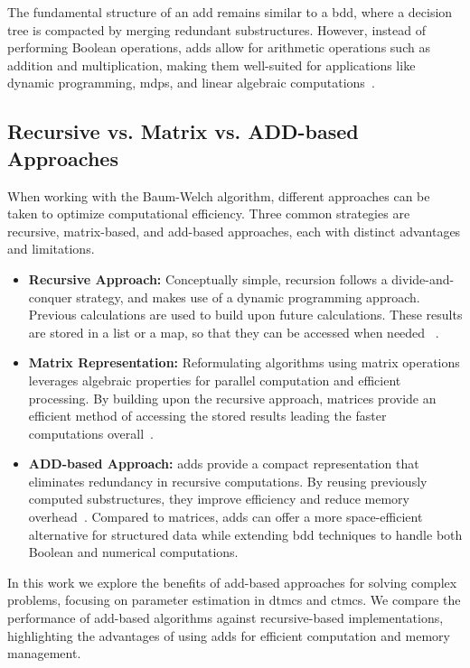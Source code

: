 The fundamental structure of an \gls{add} remains similar to a \gls{bdd}, where a decision tree is compacted by merging redundant substructures.
However, instead of performing Boolean operations, \glspl{add} allow for arithmetic operations such as addition and multiplication, making them well-suited for applications like dynamic programming, \glspl{mdp}, and linear algebraic computations~\cite{bahar1997algebric}.

\subsection{Recursive vs. Matrix vs. ADD-based Approaches}\label{subsec:approaches}
When working with the Baum-Welch algorithm, different approaches can be taken to optimize computational efficiency.
Three common strategies are recursive, matrix-based, and \gls{add}-based approaches, each with distinct advantages and limitations.
\begin{itemize}
      \item \textbf{Recursive Approach:} Conceptually simple, recursion follows a divide-and-conquer strategy, and makes use of a dynamic programming approach. Previous calculations are used to build upon future calculations. These results are stored in a list or a map, so that they can be accessed when needed ~\cite[Chapter 4]{cormen2022introduction}.
      \item \textbf{Matrix Representation:} Reformulating algorithms using matrix operations leverages algebraic properties for parallel computation and efficient processing.
            By building upon the recursive approach, matrices provide an efficient method of accessing the stored results leading the faster computations overall~\cite[Chapter 4, 15 \& 28]{cormen2022introduction}.
      \item \textbf{ADD-based Approach:} \glspl{add} provide a compact representation that eliminates redundancy in recursive computations.
            By reusing previously computed substructures, they improve efficiency and reduce memory overhead~\cite{bahar1997algebric}.
            Compared to matrices, \glspl{add} can offer a more space-efficient alternative for structured data while extending \gls{bdd} techniques to handle both Boolean and numerical computations.
\end{itemize}

In this work we explore the benefits of \gls{add}-based approaches for solving complex problems, focusing on parameter estimation in \glspl{dtmc} and \glspl{ctmc}.
We compare the performance of \gls{add}-based algorithms against recursive-based implementations, highlighting the advantages of using \glspl{add} for efficient computation and memory management.


